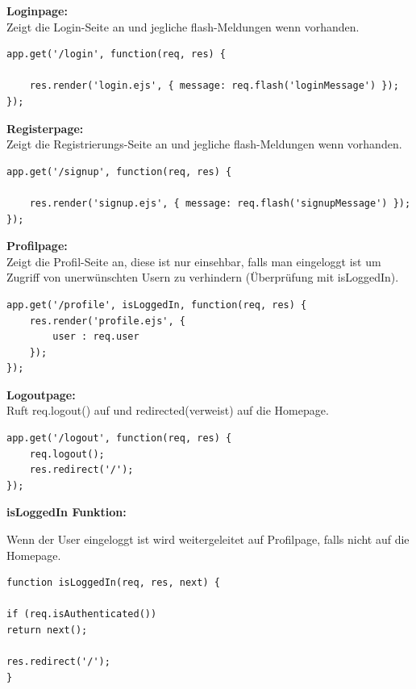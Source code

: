\leftskip=0pt
\textbf{Loginpage:}\\

\leftskip=20pt
Zeigt die Login-Seite an und jegliche flash-Meldungen wenn vorhanden.
\begin{lstlisting}
app.get('/login', function(req, res) {
	
	res.render('login.ejs', { message: req.flash('loginMessage') }); 
});
\end{lstlisting}

\leftskip=0pt
\textbf{Registerpage:}\\

\leftskip=20pt
Zeigt die Registrierungs-Seite an und jegliche flash-Meldungen wenn vorhanden.
\begin{lstlisting}
app.get('/signup', function(req, res) {

	res.render('signup.ejs', { message: req.flash('signupMessage') });
});
\end{lstlisting}

\leftskip=0pt
\textbf{Profilpage:}\\

\leftskip=20pt
Zeigt die Profil-Seite an, diese ist nur einsehbar, falls man eingeloggt ist um Zugriff von unerwünschten Usern zu verhindern (Überprüfung mit isLoggedIn).

\begin{lstlisting}
app.get('/profile', isLoggedIn, function(req, res) {
	res.render('profile.ejs', {
		user : req.user 
	});
});
\end{lstlisting}

\leftskip=0pt
\textbf{Logoutpage:}\\

\leftskip=20pt
Ruft req.logout() auf und redirected(verweist) auf die Homepage.
\begin{lstlisting}
app.get('/logout', function(req, res) {
	req.logout();
	res.redirect('/');
});
\end{lstlisting}

\leftskip=0pt
\textbf{isLoggedIn Funktion:}

\leftskip=20pt
Wenn der User eingeloggt ist wird weitergeleitet auf Profilpage, falls nicht auf die Homepage.
\begin{lstlisting}
function isLoggedIn(req, res, next) {

if (req.isAuthenticated())
return next();

res.redirect('/');
}
\end{lstlisting}


